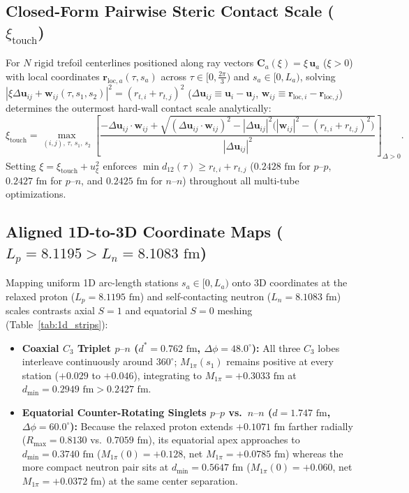\documentclass[11pt, a4paper]{article}
\DeclareRobustCommand{\Rmax}{R_{\max}}
\DeclareRobustCommand{\dmin}{d_{\min}}
\begin{document}
\subsection{\texorpdfstring{Closed-Form Pairwise Steric Contact Scale ($\xi_{\mathrm{touch}}$)}{Closed-Form Pairwise Steric Contact Scale}}
For $N$ rigid trefoil centerlines positioned along ray vectors $\mathbf{C}_a(\xi) = \xi\,\mathbf{u}_a$ ($\xi > 0$) with local coordinates $\mathbf{r}_{\mathrm{loc},a}(\tau, s_a)$ across $\tau \in [0, \frac{2\pi}{3})$ and $s_a \in [0, L_a)$, solving $|\xi\Delta\mathbf{u}_{ij} + \mathbf{w}_{ij}(\tau, s_1, s_2)|^2 = (r_{t,i} + r_{t,j})^2$ ($\Delta\mathbf{u}_{ij} \equiv \mathbf{u}_i - \mathbf{u}_j$, $\mathbf{w}_{ij} \equiv \mathbf{r}_{\mathrm{loc},i} - \mathbf{r}_{\mathrm{loc},j}$) determines the outermost hard-wall contact scale analytically:
\begin{equation}
    \xi_{\mathrm{touch}} = \max_{(i,j),\,\tau,\,s_1,\,s_2} \left[ \frac{-\Delta\mathbf{u}_{ij}\cdot\mathbf{w}_{ij} + \sqrt{(\Delta\mathbf{u}_{ij}\cdot\mathbf{w}_{ij})^2 - |\Delta\mathbf{u}_{ij}|^2\big(|\mathbf{w}_{ij}|^2 - (r_{t,i} + r_{t,j})^2\big)}}{|\Delta\mathbf{u}_{ij}|^2} \right]_{\!\Delta > 0}.
    \label{eq:exact_quadratic_touch}
\end{equation}
Setting $\xi = \xi_{\mathrm{touch}} + u_\xi^2$ enforces $\min d_{12}(\tau) \ge r_{t,i} + r_{t,j}$ ($0.2428\text{ fm}$ for $p\text{--}p$, $0.2427\text{ fm}$ for $p\text{--}n$, and $0.2425\text{ fm}$ for $n\text{--}n$) throughout all multi-tube optimizations.

\subsection{\texorpdfstring{Aligned 1D-to-3D Coordinate Maps ($L_p = 8.1195 > L_n = 8.1083\text{ fm}$)}{Aligned 1D-to-3D Coordinate Maps}}
Mapping uniform 1D arc-length stations $s_a \in [0, L_a)$ onto 3D coordinates at the relaxed proton ($L_p = 8.1195\text{ fm}$) and self-contacting neutron ($L_n = 8.1083\text{ fm}$) scales contrasts axial $S = 1$ and equatorial $S = 0$ meshing (Table~\ref{tab:1d_strips}):
\begin{itemize}[leftmargin=1.8em, itemsep=2pt]
    \item \textbf{Coaxial $C_3$ Triplet $p\text{--}n$ ($d^* = 0.762\text{ fm}$, $\Delta\phi = 48.0^\circ$):} All three $C_3$ lobes interleave continuously around $360^\circ$; $M_{1\pi}(s_1)$ remains positive at every station ($+0.029$ to $+0.046$), integrating to $M_{1\pi} = +0.3033\text{ fm}$ at $\dmin = 0.2949\text{ fm} > 0.2427\text{ fm}$.
    \item \textbf{Equatorial Counter-Rotating Singlets $p\text{--}p$ vs.\ $n\text{--}n$ ($d = 1.747\text{ fm}$, $\Delta\phi = 60.0^\circ$):} Because the relaxed proton extends $+0.1071\text{ fm}$ farther radially ($\Rmax = 0.8130$ vs.\ $0.7059\text{ fm}$), its equatorial apex approaches to $\dmin = 0.3740\text{ fm}$ ($M_{1\pi}(0) = +0.128$, net $M_{1\pi} = +0.0785\text{ fm}$) whereas the more compact neutron pair sits at $\dmin = 0.5647\text{ fm}$ ($M_{1\pi}(0) = +0.060$, net $M_{1\pi} = +0.0372\text{ fm}$) at the same center separation.
\end{itemize}
\end{document}
